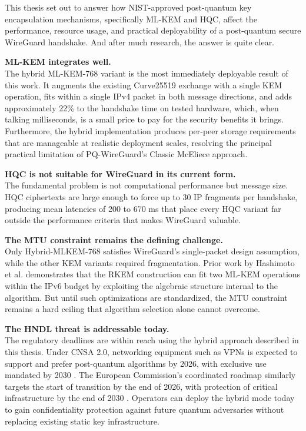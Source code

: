 
This thesis set out to answer how NIST-approved post-quantum key encapsulation mechanisms, specifically ML-KEM and HQC, affect the performance, resource usage, and practical deployability of a post-quantum secure WireGuard handshake. And after much research, the answer is quite clear.

\textbf{ML-KEM integrates well.}\\
The hybrid ML-KEM-768 variant is the most immediately deployable result of this work. It augments the existing Curve25519 exchange with a single KEM operation, fits within a single IPv4 packet in both message directions, and adds approximately 22\% to the handshake time on tested hardware, which, when talking milliseconds, is a small price to pay for the security benefits it brings. Furthermore, the hybrid implementation produces per-peer storage requirements that are manageable at realistic deployment scales, resolving the principal practical limitation of PQ-WireGuard's Classic McEliece approach.

\textbf{HQC is not suitable for WireGuard in its current form.}\\
The fundamental problem is not computational performance but message size. HQC ciphertexts are large enough to force up to 30 IP fragments per handshake, producing mean latencies of 200 to 670 ms that place every HQC variant far outside the performance criteria that makes WireGuard valuable.

\textbf{The MTU constraint remains the defining challenge.}\\
Only Hybrid-MLKEM-768 satisfies WireGuard's single-packet design assumption, while the other KEM variants required fragmentation. Prior work by Hashimoto et al. demonstrates that the RKEM construction can fit two ML-KEM operations within the IPv6 budget by exploiting the algebraic structure internal to the algorithm. But until such optimizations are standardized, the MTU constraint remains a hard ceiling that algorithm selection alone cannot overcome.

\textbf{The HNDL threat is addressable today.}\\
The regulatory deadlines are within reach using the hybrid approach described in this thesis. Under CNSA 2.0, networking equipment such as VPNs is expected to support and prefer post-quantum algorithms by 2026, with exclusive use mandated by 2030 \cite{NSA2022CNSA2}. The European Commission's coordinated roadmap similarly targets the start of transition by the end of 2026, with protection of critical infrastructure by the end of 2030 \cite{EUPQC2025Roadmap}. Operators can deploy the hybrid mode today to gain confidentiality protection against future quantum adversaries without replacing existing static key infrastructure.

